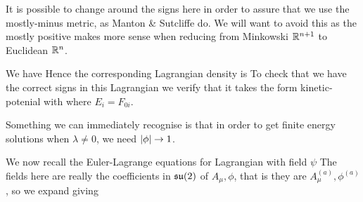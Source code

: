 \documentclass{article}
\begin{document}
\begin{remark}
	It is possible to change around the signs here in order to assure that we use the mostly-minus metric, as Manton \& Sutcliffe do. We will want to avoid this as the mostly positive makes more sense when reducing from Minkowski $\mathbb{R}^{n+1}$ to Euclidean $\mathbb{R}^n$. 
\end{remark}
We have 
Hence the corresponding Lagrangian density is 
To check that we have the correct signs in this Lagrangian we verify that it takes the form kinetic-potenial with 
where $E_i = F_{0i}$.
\begin{remark}
	Something we can immediately recognise is that in order to get finite energy solutions when $\lambda \neq 0$, we need $\left\lvert \phi \right\rvert \to 1$.
\end{remark}
We now recall the Euler-Lagrange equations for Lagrangian with field $\psi$
The fields here are really the coefficients in $\mathfrak{su}(2)$ of $A_\mu, \phi$, that is they are $A_\mu^{(a)}, \phi^{(a)}$, so we expand   
giving 
\end{document}
